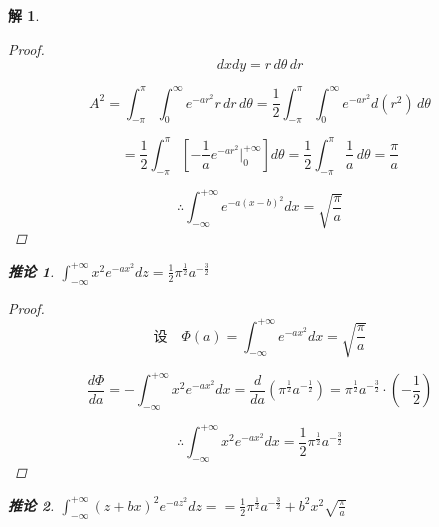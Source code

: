 \documentclass[12pt,a4paper]{article}
\newtheorem*{solution}{解}
\newtheorem{corollary}{推论}
\begin{document}
\begin{solution}
\begin{proof}
	\begin{equation*}
		dx dy = r \, d\theta \, dr
	\end{equation*}
	
	\begin{equation*}
		A^2 = \int_{-\pi}^{\pi} \int_{0}^{\infty} e^{-ar^2} r \, dr \, d\theta	= \frac{1}{2} \int_{-\pi}^{\pi} \int_{0}^{\infty} e^{-ar^2} d(r^2) \, d\theta
	\end{equation*}
	
	
	\begin{equation*}
		= \frac{1}{2} \int_{-\pi}^{\pi} \left[ -\frac{1}{a} e^{-ar^2} \Big|_{0}^{+\infty} \right] d\theta= \frac{1}{2} \int_{-\pi}^{\pi} \frac{1}{a} \, d\theta	= \frac{\pi}{a}
	\end{equation*}
	
	
	\begin{equation*}
	\therefore	\int_{-\infty}^{+\infty} e^{-a(x-b)^2} dx = \sqrt{\frac{\pi}{a}}
	\end{equation*}
	
	\end{proof}

\begin{corollary}\label{ex:5}
	$\int_{-\infty}^{+\infty} x^2 e^{-a x^2} dz = \frac{1}{2} \pi^{\frac{1}{2}} a^{-\frac{3}{2}}$
\end{corollary}



\begin{proof}
	
	
	\begin{equation*}
		\text{设} \quad \Phi(a) = \int_{-\infty}^{+\infty} e^{-a x^2} dx = \sqrt{\frac{\pi}{a}}
	\end{equation*}
	
	\begin{equation*}
		\frac{d\Phi}{da} = -\int_{-\infty}^{+\infty} x^2 e^{-a x^2} dx = \frac{d}{da} \left( \pi^{\frac{1}{2}} a^{-\frac{1}{2}} \right) = \pi^{\frac{1}{2}} a^{-\frac{3}{2}} \cdot \left( -\frac{1}{2} \right)
	\end{equation*}
	
	\begin{equation*}
		\therefore \int_{-\infty}^{+\infty} x^2 e^{-a x^2} dx = \frac{1}{2} \pi^{\frac{1}{2}} a^{-\frac{3}{2}}
	\end{equation*}
\end{proof}	


\begin{corollary}\label{ex:6}
	$	\int_{-\infty}^{+\infty} (z + bx)^2 e^{-a z^2} dz=	= \frac{1}{2} \pi^{\frac{1}{2}} a^{-\frac{3}{2}} + b^2 x^2 \sqrt{\frac{\pi}{a}}$
\end{corollary}


\end{solution}
\end{document}
